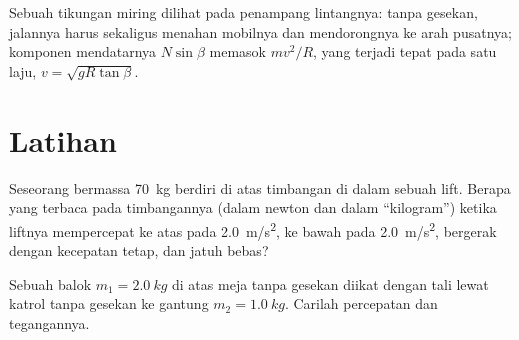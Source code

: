 \begin{omfigure}

{\small Sebuah tikungan miring dilihat pada penampang lintangnya: tanpa
gesekan,  jalannya harus sekaligus menahan mobilnya dan
mendorongnya ke arah pusatnya; komponen mendatarnya $N\sin\beta$
memasok $mv^2/R$, yang terjadi tepat pada satu laju,
$v = \sqrt{gR\tan\beta}$.}
\end{omfigure}

\section{Latihan}

\begin{exercise}[$\star$]\label{exo:b1:newton-dynamics:1}
Seseorang bermassa \qty{70}{kg} berdiri di atas timbangan di dalam
sebuah lift. Berapa yang terbaca pada timbangannya (dalam newton dan
dalam ``kilogram'') ketika liftnya mempercepat ke atas pada
\qty{2.0}{m/s^2}, ke bawah pada \qty{2.0}{m/s^2}, bergerak dengan
kecepatan tetap, dan jatuh bebas?
\end{exercise}

\begin{exercise}[$\star$]\label{exo:b1:newton-dynamics:2}
Sebuah balok $m_1 = \qty{2.0}{kg}$ di atas meja tanpa gesekan diikat
dengan tali lewat katrol tanpa gesekan ke  gantung
$m_2 = \qty{1.0}{kg}$. Carilah percepatan dan tegangannya.
\end{exercise}

